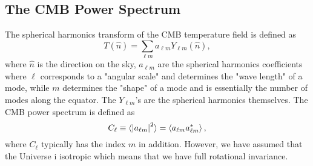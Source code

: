 \documentclass[a4paper, 10pt, reqno]{amsart}
\begin{document}
\subsection{The CMB Power Spectrum} 
The spherical harmonics transform of the CMB temperature field is defined as
\begin{equation}
    T(\hat{n}) = \sum_{\ell m}a_{\ell m} Y_{\ell m}(\hat{n}),
\end{equation}
where $\hat{n}$ is the direction on the sky, $a_{\ell m}$ are the spherical harmonics coefficients where $\ell$ corresponds to a "angular scale" and determines the "wave length" of a mode, while $m$ determines the "shape" of a mode and is essentially the number of modes along the equator. The $Y_{\ell m}$'s are the spherical harmonics themselves.
The CMB power spectrum is defined as 
\begin{equation}
    C_{\ell} \equiv \langle \abs{a_{\ell m}}^{2}\rangle=\left\langle a_{\ell m} a_{\ell m}^{*}\right\rangle,
\end{equation}
where $C_\ell$ typically has the index $m$ in addition. However, we have assumed that the Universe i isotropic which means that we have full rotational invariance. 
\end{document}
